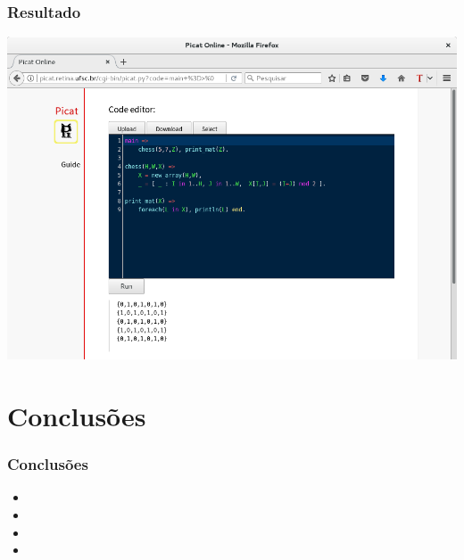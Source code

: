 \documentclass[brazil]{beamer}
\begin{document}
\begin{frame}

    \frametitle{Resultado}

\begin{center}
\includegraphics[width=.8\textwidth]{figures/resultado.png}
\end{center}
\end{frame}

\section{Conclusões}


\begin{frame}

    \frametitle{Conclusões}

    \begin{itemize}
      \item 
      \item 
      \item 
      \item 
    \end{itemize}
\end{frame}
\end{document}
